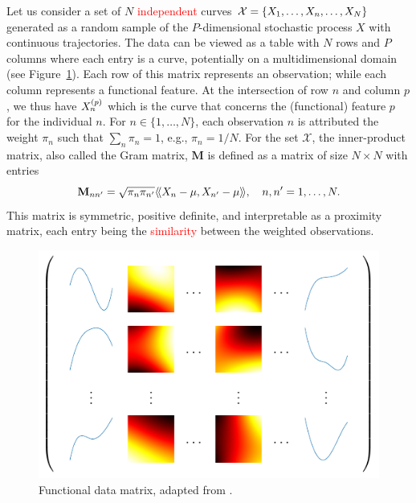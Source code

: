 Let us consider a set of $N$ \textcolor{red}{independent} curves $\mathcal{X} = \{X_1, \ldots, X_n, \ldots, X_N\}$ generated as a random sample of the $P$-dimensional stochastic process $X$ with continuous trajectories. The data can be viewed as a table with $N$ rows and $P$ columns where each entry is a curve, potentially on a multidimensional domain (see Figure~\ref{fig:data_matrix}). Each row of this matrix represents an observation; while each column represents a functional feature. At the intersection of row $n$ and column $p$, we thus have $X_n^{(p)}$ which is the curve that concerns the (functional) feature $p$ for the individual $n$. For $n \in \{1, \dots, N\}$, each observation $n$ is attributed the weight $\pi_n$ such that $\sum_n \pi_n = 1$, e.g., $\pi_n = 1/N$. For the set $\mathcal{X}$, the inner-product matrix, also called the Gram matrix, $\mathbf{M}$ is defined as a matrix of size $N \times N$ with entries
\begin{equation}\label{eq:gram_mat}
    \mathbf{M}_{nn^\prime} = \sqrt{\pi_n \pi_{n^{\prime}}}\langle\!\langle X_n - \mu, X_{n^\prime} - \mu\rangle\!\rangle, \quad n, n^\prime = 1, \dots, N.
\end{equation}
This matrix is symmetric, positive definite, and interpretable as a proximity matrix, each entry being the \textcolor{red}{similarity} between the weighted observations.

\begin{figure}
    \centering
    \includegraphics[]{figures/data_matrix.pdf}
    \caption{Functional data matrix, adapted from \cite{berrenderoPrincipalComponentsMultivariate2011}.}
    \label{fig:data_matrix}
\end{figure}

